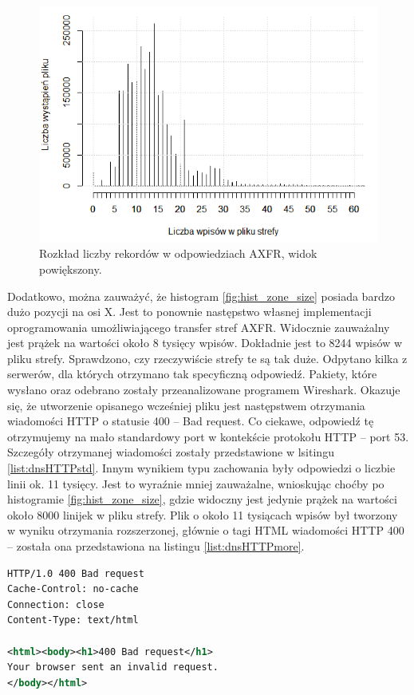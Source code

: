\begin{figure}[ht]
\centering
\includegraphics[width=1.0\textwidth]{image/hist_zone_size_zoom_no_title}
\caption{Rozkład liczby rekordów w odpowiedziach AXFR, widok powiększony.}
\label{fig:hist_zone_size_zoom}
\end{figure}

Dodatkowo, można zauważyć, że histogram \ref{fig:hist_zone_size} posiada bardzo dużo pozycji na osi X. Jest to ponownie następstwo
własnej implementacji oprogramowania umożliwiającego transfer stref AXFR. Widocznie zauważalny jest prążek na wartości około 8 tysięcy
wpisów. Dokładnie jest to 8244 wpisów w pliku strefy. Sprawdzono, czy rzeczywiście strefy te są tak duże. Odpytano kilka z serwerów,
dla których otrzymano tak specyficzną odpowiedź. Pakiety, które wysłano oraz odebrano zostały przeanalizowane programem Wireshark.
Okazuje się, że utworzenie opisanego wcześniej pliku jest następstwem otrzymania wiadomości HTTP o statusie 400 -- Bad request.
Co ciekawe, odpowiedź tę otrzymujemy na mało standardowy port w kontekście protokołu HTTP -- port 53. Szczegóły otrzymanej wiadomości
zostały przedstawione w lsitingu \ref{list:dnsHTTPstd}. Innym wynikiem typu zachowania były odpowiedzi o liczbie linii ok. 11 tysięcy.
Jest to wyraźnie mniej zauważalne, wnioskując choćby po histogramie \ref{fig:hist_zone_size}, gdzie widoczny jest jedynie prążek na
wartości około 8000 linijek w pliku strefy. Plik o około 11 tysiącach wpisów był tworzony w wyniku otrzymania rozszerzonej, głównie o tagi HTML
 wiadomości HTTP 400 -- została ona przedstawiona na listingu \ref{list:dnsHTTPmore}.

\begin{lstlisting}[label={list:dnsHTTPstd},captionpos=b,caption=Odpowiedź HTTP 400 na zapytanie DNS.,language=xml]
HTTP/1.0 400 Bad request
Cache-Control: no-cache
Connection: close
Content-Type: text/html

<html><body><h1>400 Bad request</h1>
Your browser sent an invalid request.
</body></html>
\end{lstlisting}

